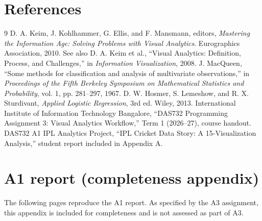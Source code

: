 \documentclass[11pt]{article}
\begin{document}
\section*{References}
\begin{thebibliography}{9}
 D. A. Keim, J. Kohlhammer, G. Ellis, and F. Mansmann, editors, \emph{Mastering the Information Age: Solving Problems with Visual Analytics}. Eurographics Association, 2010. See also D. A. Keim et al., ``Visual Analytics: Definition, Process, and Challenges,'' in \emph{Information Visualization}, 2008.
 J. MacQueen, ``Some methods for classification and analysis of multivariate observations,'' in \emph{Proceedings of the Fifth Berkeley Symposium on Mathematical Statistics and Probability}, vol. 1, pp. 281--297, 1967.
 D. W. Hosmer, S. Lemeshow, and R. X. Sturdivant, \emph{Applied Logistic Regression}, 3rd ed. Wiley, 2013.
 International Institute of Information Technology Bangalore, ``DAS732 Programming Assignment 3: Visual Analytics Workflow,'' Term 1 (2026--27), course handout.
 DAS732 A1 IPL Analytics Project, ``IPL Cricket Data Story: A 15-Visualization Analysis,'' student report included in Appendix A.
\end{thebibliography}

\appendix
\section{A1 report (completeness appendix)}
The following pages reproduce the A1 report. As specified by the A3 assignment, this appendix is included for completeness and is not assessed as part of A3.

\end{document}
